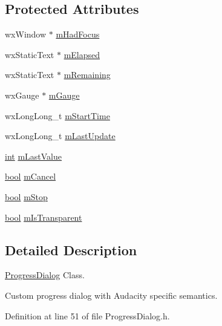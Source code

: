 \subsection*{Protected Attributes}
\begin{DoxyCompactItemize}
\item 
wx\+Window $\ast$ \hyperlink{class_progress_dialog_a0bff55d2f66d08b8ab01721500dc5ab4}{m\+Had\+Focus}
\item 
wx\+Static\+Text $\ast$ \hyperlink{class_progress_dialog_a0f6a9cb9ef093ea91f252c7589c8bbef}{m\+Elapsed}
\item 
wx\+Static\+Text $\ast$ \hyperlink{class_progress_dialog_a424c37177a055e7f3e22bf0e2cd9c2c9}{m\+Remaining}
\item 
wx\+Gauge $\ast$ \hyperlink{class_progress_dialog_a1c220266931cd60d76ddf0f1de6c5d93}{m\+Gauge}
\item 
wx\+Long\+Long\+\_\+t \hyperlink{class_progress_dialog_a666a2fcdf5f58018bd89baf8ef4005b5}{m\+Start\+Time}
\item 
wx\+Long\+Long\+\_\+t \hyperlink{class_progress_dialog_a6f0d4ff7c012a3356642d5e818c99eb5}{m\+Last\+Update}
\item 
\hyperlink{xmltok_8h_a5a0d4a5641ce434f1d23533f2b2e6653}{int} \hyperlink{class_progress_dialog_a42313289469eb4bdb7877c51eb4cb6a0}{m\+Last\+Value}
\item 
\hyperlink{mac_2config_2i386_2lib-src_2libsoxr_2soxr-config_8h_abb452686968e48b67397da5f97445f5b}{bool} \hyperlink{class_progress_dialog_a3bfbfef2a98f9a9f31e3fb004de1d2eb}{m\+Cancel}
\item 
\hyperlink{mac_2config_2i386_2lib-src_2libsoxr_2soxr-config_8h_abb452686968e48b67397da5f97445f5b}{bool} \hyperlink{class_progress_dialog_a18d928e615df260cf299fec8ea92ea8d}{m\+Stop}
\item 
\hyperlink{mac_2config_2i386_2lib-src_2libsoxr_2soxr-config_8h_abb452686968e48b67397da5f97445f5b}{bool} \hyperlink{class_progress_dialog_a821cd27b713fc013b94e3a3a8e4a5a01}{m\+Is\+Transparent}
\end{DoxyCompactItemize}


\subsection{Detailed Description}
\hyperlink{class_progress_dialog}{Progress\+Dialog} Class. 

Custom progress dialog with Audacity specific semantics. 

Definition at line 51 of file Progress\+Dialog.\+h.



